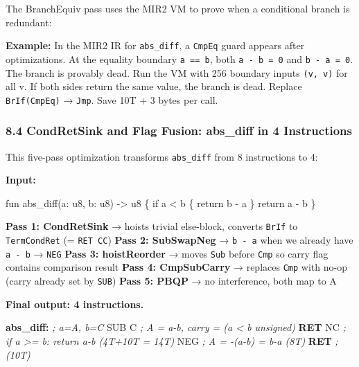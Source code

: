 \documentclass[
  11pt,
]{article}
\newenvironment{Shaded}{\begin{snugshade}}{\end{snugshade}}
\newcommand{\BuiltInTok}[1]{#1}
\newcommand{\CommentTok}[1]{\textcolor[rgb]{0.56,0.35,0.01}{\textit{#1}}}
\newcommand{\ControlFlowTok}[1]{\textcolor[rgb]{0.13,0.29,0.53}{\textbf{#1}}}
\newcommand{\FunctionTok}[1]{\textcolor[rgb]{0.13,0.29,0.53}{\textbf{#1}}}
\newcommand{\NormalTok}[1]{#1}
\begin{document}
The BranchEquiv pass uses the MIR2 VM to prove when a conditional branch
is redundant:

\textbf{Example:} In the MIR2 IR for \texttt{abs\_diff}, a
\texttt{CmpEq} guard appears after optimizations. At the equality
boundary \texttt{a\ ==\ b}, both \texttt{a\ -\ b\ =\ 0} and
\texttt{b\ -\ a\ =\ 0}. The branch is provably dead. Run the VM with 256
boundary inputs \texttt{(v,\ v)} for all v. If both sides return the
same value, the branch is dead. Replace \texttt{BrIf(CmpEq)} →
\texttt{Jmp}. Save 10T + 3 bytes per call.

\hypertarget{condretsink-and-flag-fusion-abs_diff-in-4-instructions}{%
\subsubsection{8.4 CondRetSink and Flag Fusion: abs\_diff in 4
Instructions}\label{condretsink-and-flag-fusion-abs_diff-in-4-instructions}}

This five-pass optimization transforms \texttt{abs\_diff} from 8
instructions to 4:

\textbf{Input:}

\begin{Shaded}
\begin{Highlighting}[]
\NormalTok{fun abs\_diff(a: u8, b: u8) {-}\textgreater{} u8 \{}
\NormalTok{    if a \textless{} b \{ return b {-} a \}}
\NormalTok{    return a {-} b}
\NormalTok{\}}
\end{Highlighting}
\end{Shaded}

\textbf{Pass 1: CondRetSink} → hoists trivial else-block, converts
\texttt{BrIf} to \texttt{TermCondRet} (= \texttt{RET\ CC}) \textbf{Pass
2: SubSwapNeg} → \texttt{b\ -\ a} when we already have \texttt{a\ -\ b}
→ \texttt{NEG} \textbf{Pass 3: hoistReorder} → moves \texttt{Sub} before
\texttt{Cmp} so carry flag contains comparison result \textbf{Pass 4:
CmpSubCarry} → replaces \texttt{Cmp} with no-op (carry already set by
\texttt{SUB}) \textbf{Pass 5: PBQP} → no interference, both map to A

\textbf{Final output: 4 instructions.}

\begin{Shaded}
\begin{Highlighting}[]
\FunctionTok{abs\_diff:}   \CommentTok{; a=A, b=C}
    \BuiltInTok{SUB}\NormalTok{ C       }\CommentTok{; A = a{-}b, carry = (a \textless{} b unsigned)}
    \ControlFlowTok{RET}\NormalTok{ NC      }\CommentTok{; if a \textgreater{}= b: return a{-}b (4T+10T = 14T)}
    \BuiltInTok{NEG}         \CommentTok{; A = {-}(a{-}b) = b{-}a  (8T)}
    \ControlFlowTok{RET}         \CommentTok{; (10T)}
\end{Highlighting}
\end{Shaded}
\end{document}
